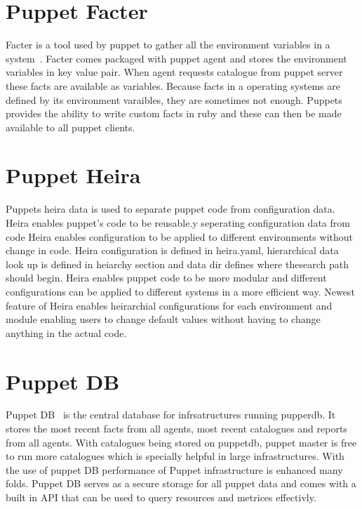 \section{Puppet Facter}

Facter is a tool used by puppet to gather all the environment
variables in a system~\cite{hid-sp18-413-puppet-facter}. Facter comes packaged with puppet agent and
stores the environment variables in key value pair. When agent
requests catalogue from puppet server these facts are available as
variables. Because facts in a operating systems are defined by its
environment varaibles, they are sometimes not enough. Puppets
provides the ability to write custom facts in ruby and these can then
be made available to all puppet clients.

\section{Puppet Heira}

Puppets heira data is used to separate puppet code from configuration
data. Heira enables puppet's code to be reusable.y seperating
configuration data from code Heira enables configuration to be applied
to different environments without change in code. Heira configuration
is defined in heira.yaml,  hierarchical data look up is defined in
heiarchy section and  data dir defines where thesearch  path should
begin. Heira enables puppet code to be more modular and different
configurations can be applied to different systems in a more efficient
way. Newest feature of Heira enables heirarchial configurations for
each environment and module enabling users to change default values
without having to change anything in the actual code.

\section{Puppet DB}
Puppet DB~\cite{hid-sp18-413-puppet-db} is the central database for infrsatructures running pupperdb.  It
stores the most recent facts from all agents, most recent catalogues and reports
from all agents. With catalogues being stored on puppetdb, puppet master is free
to run more catalogues which is specially helpful in large infrastructures. With
the use of puppet DB performance of Puppet infrastructure is enhanced many
folds. Puppet DB serves as a secure storage for all puppet data and comes with a
built in API that can be used to query resources and metrices effectivly.

